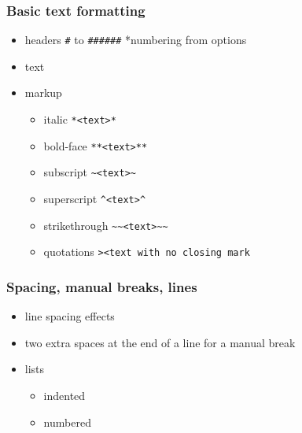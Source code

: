 \documentclass[
]{article}
\providecommand{\tightlist}{%
  \setlength{\itemsep}{0pt}\setlength{\parskip}{0pt}}
\begin{document}
\hypertarget{basic-text-formatting}{%
\subsubsection{Basic text formatting}\label{basic-text-formatting}}

\begin{itemize}
\tightlist
\item
  headers \texttt{\#} to \texttt{\#\#\#\#\#\#} *numbering from options
\item
  text
\item
  markup

  \begin{itemize}
  \tightlist
  \item
    italic \texttt{*\textless{}text\textgreater{}*}
  \item
    bold-face \texttt{**\textless{}text\textgreater{}**}
  \item
    subscript
    \texttt{\textasciitilde{}\textless{}text\textgreater{}\textasciitilde{}}
  \item
    superscript \texttt{\^{}\textless{}text\textgreater{}\^{}}
  \item
    strikethrough
    \texttt{\textasciitilde{}\textasciitilde{}\textless{}text\textgreater{}\textasciitilde{}\textasciitilde{}}
  \item
    quotations
    \texttt{\textgreater{}\textless{}text\ with\ no\ closing\ mark}
  \end{itemize}
\end{itemize}

\hypertarget{spacing-manual-breaks-lines}{%
\subsubsection{Spacing, manual breaks,
lines}\label{spacing-manual-breaks-lines}}

\begin{itemize}
\tightlist
\item
  line spacing effects
\item
  two extra spaces at the end of a line for a manual break
\item
  lists

  \begin{itemize}
  \tightlist
  \item
    indented
  \item
    numbered
  \end{itemize}
\end{itemize}
\end{document}
